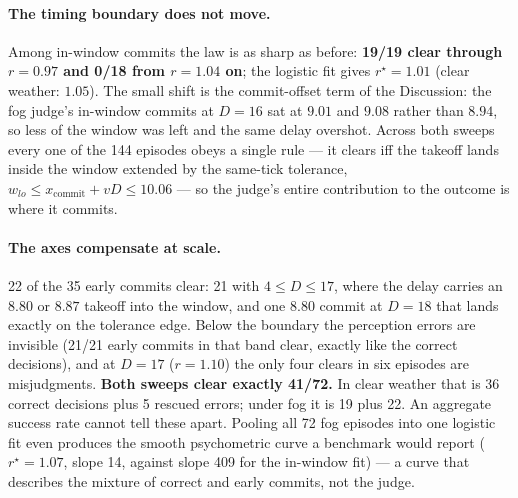 \documentclass[11pt]{article}
\newcommand{\rstar}{r^{\star}}
\begin{document}
\paragraph{The timing boundary does not move.} Among in-window commits the
law is as sharp as before: \textbf{19/19 clear through $r = 0.97$ and 0/18
from $r = 1.04$ on}; the logistic fit gives $\rstar = 1.01$ (clear weather:
$1.05$). The small shift is the commit-offset term of the Discussion: the fog
judge's in-window commits at $D = 16$ sat at $9.01$ and $9.08$ rather than
$8.94$, so less of the window was left and the same delay overshot. Across
both sweeps every one of the 144 episodes obeys a single rule --- it clears
iff the takeoff lands inside the window extended by the same-tick tolerance,
$w_{lo} \le x_{\text{commit}} + vD \le 10.06$ --- so the judge's entire
contribution to the outcome is where it commits.

\paragraph{The axes compensate at scale.} 22 of the 35 early commits clear:
21 with $4 \le D \le 17$, where the delay carries an $8.80$ or $8.87$ takeoff
into the window, and one $8.80$ commit at $D = 18$ that lands exactly on the
tolerance edge. Below the boundary the perception errors are
invisible (21/21 early commits in that band clear, exactly like the correct
decisions), and at $D = 17$ ($r = 1.10$) the only four clears in six episodes
are misjudgments. \textbf{Both sweeps clear exactly 41/72.} In clear weather
that is 36 correct decisions plus 5 rescued errors; under fog it is 19 plus
22. An aggregate success rate cannot tell these apart. Pooling all 72 fog
episodes into one logistic fit even produces the smooth psychometric curve a
benchmark would report ($\rstar = 1.07$, slope 14, against slope 409 for the
in-window fit) --- a curve that describes the mixture of correct and early
commits, not the judge.
\end{document}
